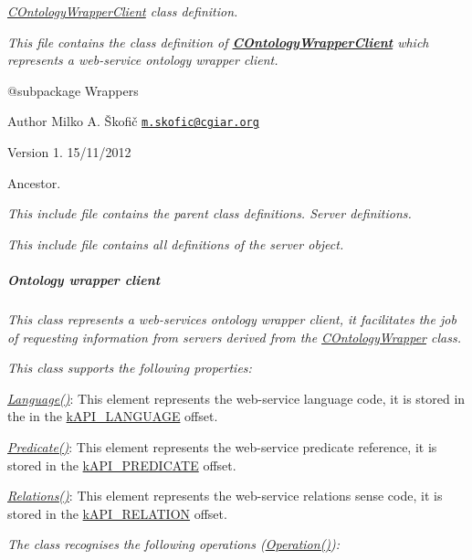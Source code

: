 {\itshape {\itshape \hyperlink{class_c_ontology_wrapper_client}{C\-Ontology\-Wrapper\-Client}} class definition.}

{\itshape This file contains the class definition of {\bfseries \hyperlink{class_c_ontology_wrapper_client}{C\-Ontology\-Wrapper\-Client}} which represents a web-\/service ontology wrapper client.}

{\itshape \begin{DoxyVerb} @subpackage        Wrappers
\end{DoxyVerb}
}

{\itshape \begin{DoxyAuthor}{Author}
Milko A. Škofič \href{mailto:m.skofic@cgiar.org}{\tt m.\-skofic@cgiar.\-org} 
\end{DoxyAuthor}
\begin{DoxyVersion}{Version}
1. 15/11/2012
\end{DoxyVersion}
Ancestor.}

{\itshape This include file contains the parent class definitions. Server definitions.}

{\itshape This include file contains all definitions of the server object. \subparagraph*{Ontology wrapper client}}

{\itshape }

{\itshape This class represents a web-\/services ontology wrapper client, it facilitates the job of requesting information from servers derived from the \hyperlink{class_c_ontology_wrapper}{C\-Ontology\-Wrapper} class.}

{\itshape This class supports the following properties\-:}

{\itshape 
\begin{DoxyItemize}
\item {\itshape \hyperlink{}{Language()}}\-: This element represents the web-\/service language code, it is stored in the in the \hyperlink{}{k\-A\-P\-I\-\_\-\-L\-A\-N\-G\-U\-A\-G\-E} offset. 
\item {\itshape \hyperlink{}{Predicate()}}\-: This element represents the web-\/service predicate reference, it is stored in the \hyperlink{}{k\-A\-P\-I\-\_\-\-P\-R\-E\-D\-I\-C\-A\-T\-E} offset. 
\item {\itshape \hyperlink{}{Relations()}}\-: This element represents the web-\/service relations sense code, it is stored in the \hyperlink{}{k\-A\-P\-I\-\_\-\-R\-E\-L\-A\-T\-I\-O\-N} offset. 
\end{DoxyItemize}}

{\itshape The class recognises the following operations (\hyperlink{}{Operation()})\-:}

